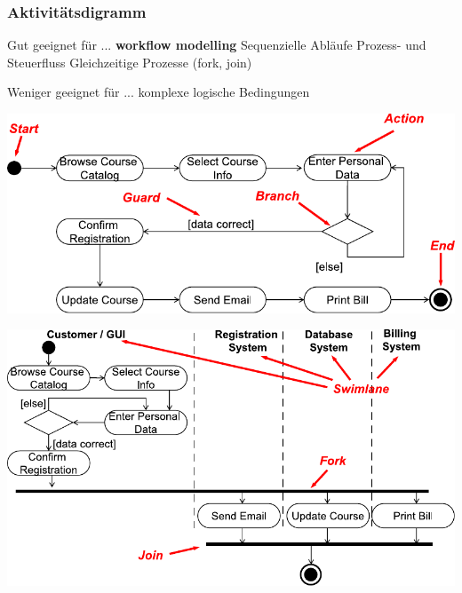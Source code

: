 \subsubsection{Aktivitätsdigramm}

\begin{minipage}[t]{0.48\columnwidth}
    \begin{outline}
        \1 Gut geeignet für ...
            \2 \textbf{workflow modelling}
            \2 Sequenzielle Abläufe
            \2 Prozess- und Steuerfluss
            \2 Gleichzeitige Prozesse (fork, join)
    \end{outline}
\end{minipage}
\hfill
\begin{minipage}[t]{0.48\columnwidth}
    \begin{outline}
        \1 Weniger geeignet für ...
            \2 komplexe logische Bedingungen
    \end{outline}
\end{minipage}


\begin{center}
    \includegraphics[width=0.8\columnwidth]{images/aktivitaetsdiagramm_elemente.pdf}

    \vspace{0.3cm}

    \includegraphics[width=0.8\columnwidth]{images/aktivitaetsdiagramm_parallelitaet.pdf}
\end{center}

